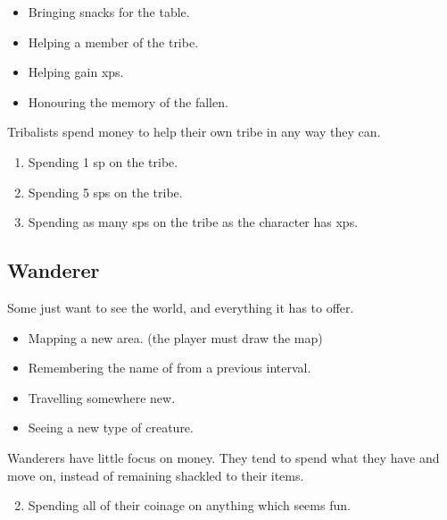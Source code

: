 \begin{multicols}{2}
\begin{itemize}
  \item
  Bringing snacks for the table.
  \item
  Helping a member of the tribe.
  \item
  Helping  gain \glspl{xp}.
  \item
  Honouring the memory of the fallen.
\end{itemize}

Tribalists spend money to help their own tribe in any way they can.

\begin{enumerate}
  \item
  Spending 1 \gls{sp} on the tribe.
  \item
  Spending 5 \glspl{sp} on the tribe.
  \item
  Spending as many \glspl{sp} on the tribe as the character has \glspl{xp}.
\end{enumerate}

\subsection{Wanderer}

Some just want to see the world, and everything it has to offer.

\begin{itemize}

  \item
  Mapping a new area. (the player must draw the map)
  \item
  Remembering the name of  from a previous \gls{interval}.
  \item
  Travelling somewhere new.
  \item
  Seeing a new type of creature.

\end{itemize}

Wanderers have little focus on money.
They tend to spend what they have and move on, instead of remaining shackled to their items.

\begin{enumerate}
  \setcounter{enumi}{1}
  \item
  Spending all of their coinage on anything which seems fun.
\end{enumerate}


\end{multicols}

\section{}
\label{xpCosts}

